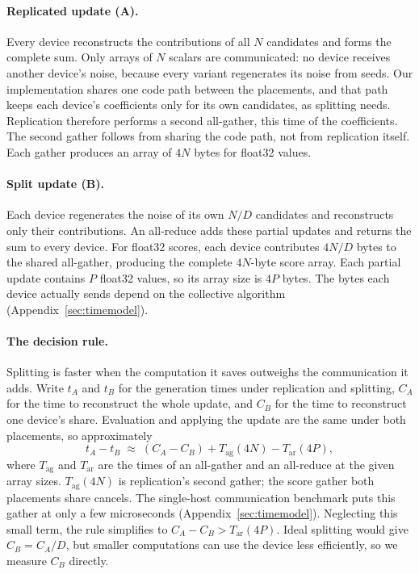 \paragraph{Replicated update (A).} Every device reconstructs the contributions of all
$N$ candidates and forms the complete sum. Only arrays of $N$ scalars are communicated:
no device receives another device's noise, because every variant regenerates its noise
from seeds. Our implementation shares one code path between the placements, and that
path keeps each device's coefficients only for its own candidates, as splitting needs.
Replication therefore performs a second all-gather, this time of the coefficients. The
second gather follows from sharing the code path, not from replication itself. Each
gather produces an array of $4N$ bytes for float32 values.

\paragraph{Split update (B).} Each device regenerates the noise of its own $N/D$
candidates and reconstructs only their contributions. An all-reduce adds these partial
updates and returns the sum to every device. For float32 scores, each device contributes
$4N/D$ bytes to the shared all-gather, producing the complete $4N$-byte score array. Each
partial update contains $P$ float32 values, so its array size is $4P$ bytes. The bytes each
device actually sends depend on the collective algorithm (Appendix~\ref{sec:timemodel}).

\paragraph{The decision rule.} Splitting is faster when the computation it saves outweighs
the communication it adds. Write $t_A$ and $t_B$ for the generation times under replication
and splitting, $C_A$ for the time to reconstruct the whole update, and $C_B$ for the time to
reconstruct one device's share. Evaluation and applying the update are the same under both
placements, so approximately
\begin{equation}
  t_A-t_B \;\approx\; (C_A-C_B)+T_{\mathrm{ag}}(4N)-T_{\mathrm{ar}}(4P),
  \label{eq:crossover}
\end{equation}
where $T_{\mathrm{ag}}$ and $T_{\mathrm{ar}}$ are the times of an all-gather and an
all-reduce at the given array sizes. $T_{\mathrm{ag}}(4N)$ is replication's second gather;
the score gather both placements share cancels. The single-host communication benchmark
puts this gather at only a few microseconds (Appendix~\ref{sec:timemodel}). Neglecting
this small term, the rule simplifies to $C_A-C_B > T_{\mathrm{ar}}(4P)$. Ideal splitting
would give $C_B=C_A/D$, but smaller computations can use the device less efficiently,
so we measure $C_B$ directly.

